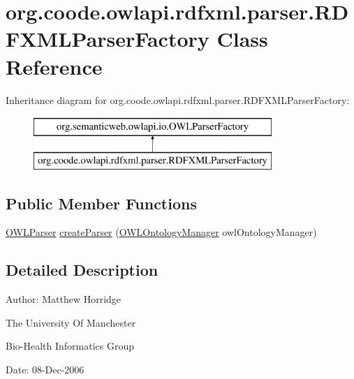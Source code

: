 \hypertarget{classorg_1_1coode_1_1owlapi_1_1rdfxml_1_1parser_1_1_r_d_f_x_m_l_parser_factory}{\section{org.\-coode.\-owlapi.\-rdfxml.\-parser.\-R\-D\-F\-X\-M\-L\-Parser\-Factory Class Reference}
\label{classorg_1_1coode_1_1owlapi_1_1rdfxml_1_1parser_1_1_r_d_f_x_m_l_parser_factory}
}
Inheritance diagram for org.\-coode.\-owlapi.\-rdfxml.\-parser.\-R\-D\-F\-X\-M\-L\-Parser\-Factory\-:\begin{figure}[H]
\begin{center}
\leavevmode
\includegraphics[height=2.000000cm]{classorg_1_1coode_1_1owlapi_1_1rdfxml_1_1parser_1_1_r_d_f_x_m_l_parser_factory}
\end{center}
\end{figure}
\subsection*{Public Member Functions}
\begin{DoxyCompactItemize}
\item 
\hyperlink{interfaceorg_1_1semanticweb_1_1owlapi_1_1io_1_1_o_w_l_parser}{O\-W\-L\-Parser} \hyperlink{classorg_1_1coode_1_1owlapi_1_1rdfxml_1_1parser_1_1_r_d_f_x_m_l_parser_factory_a4a2670c1fd482e8319a228fd8a428650}{create\-Parser} (\hyperlink{interfaceorg_1_1semanticweb_1_1owlapi_1_1model_1_1_o_w_l_ontology_manager}{O\-W\-L\-Ontology\-Manager} owl\-Ontology\-Manager)
\end{DoxyCompactItemize}


\subsection{Detailed Description}
Author\-: Matthew Horridge\par
 The University Of Manchester\par
 Bio-\/\-Health Informatics Group\par
 Date\-: 08-\/\-Dec-\/2006\par
\par
 


